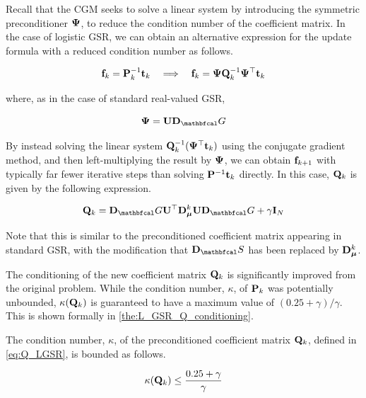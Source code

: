Recall that the CGM seeks to solve a linear system by introducing the symmetric preconditioner $\mathbf{\Psi}$, to reduce the condition number of the coefficient matrix. In the case of logistic GSR, we can obtain an alternative expression for the update formula with a reduced condition number as follows. 

\begin{equation*}
    \mathbf{f}_k = \mathbf{P}^{-1}_k \mathbf{t}_k \quad \Longrightarrow \quad \mathbf{f}_k = \mathbf{\Psi} \mathbf{Q}_k^{-1} \mathbf{\Psi}^\top \mathbf{t}_k
\end{equation*}

where, as in the case of standard real-valued GSR, 

\begin{equation*}
    \PSI = \U \D_\Gt
\end{equation*}

By instead solving the linear system $\mathbf{Q}_k^{-1} (\mathbf{\Psi}^\top \mathbf{t}_k)$ using the conjugate gradient method, and then left-multiplying the result by $\mathbf{\Psi}$, we can obtain $\mathbf{f}_{k+1}$ with typically far fewer iterative steps than solving $\mathbf{P}^{-1} \mathbf{t}_k$ directly. In this case, $\mathbf{Q}_k$ is given by the following expression. 

\begin{equation}
    \label{eq:Q_LGSR}
    \Q_k = \D_\Gt \U^\top \D_{\muu}^k \U \D_\Gt + \gamma \I_N
\end{equation}

Note that this is similar to the preconditioned coefficient matrix appearing in standard GSR, with the modification that $\D_\St$ has been replaced by $\mathbf{D}_{\boldsymbol{\mu}}^k$. 

The conditioning of the new coefficient matrix $\mathbf{Q}_k$ is significantly improved from the original problem. While the condition number, $\kappa$, of $\mathbf{P}_k$ was potentially unbounded, $\kappa(\mathbf{Q}_k)$ is guaranteed to have a maximum value of $(0.25 + \gamma) / \gamma$.  This is shown formally in \cref{the:L_GSR_Q_conditioning}. 

\begin{theorem}
    \label{the:L_GSR_Q_conditioning}
    
    The condition number, $\kappa$, of the preconditioned coefficient matrix $\mathbf{Q}_k$, defined in \cref{eq:Q_LGSR}, is bounded as follows. 
    
    \begin{equation}
        \kappa(\mathbf{Q}_k) \leq \frac{0.25 + \gamma}{\gamma}
    \end{equation}

\end{theorem}

